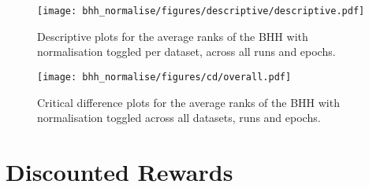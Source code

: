\begin{figure}[htbp]
	\centering
	\texttt{[image: bhh\_normalise/figures/descriptive/descriptive.pdf]}
	\caption{Descriptive plots for the average ranks of the \acs{BHH} with normalisation toggled per dataset, across all runs and epochs.}
	\label{fig:results:normalise:descriptive:descriptive}
\end{figure}

\begin{figure}[htbp]
	\centering
	\texttt{[image: bhh\_normalise/figures/cd/overall.pdf]}
	\caption{Critical difference plots for the average ranks of the \acs{BHH} with normalisation toggled across all datasets, runs and epochs.}
	\label{fig:results:normalise:descriptive:cd}
\end{figure}

\section{Discounted Rewards}\label{sec:results:bhh_variant_discounted_rewards}

